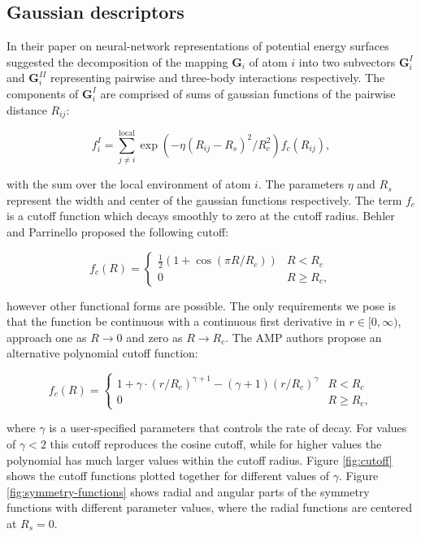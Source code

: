\subsection{Gaussian descriptors}
In their paper on neural-network representations of
potential energy surfaces \parencite[Behler, J\"{o}rg and
Parrinello, Michele]{behler2007generalized}
suggested the decomposition of the mapping $\bm{G}_i$ of atom $i$
into two subvectors $\bm{G}_i^I$ and $\bm{G}_i^{II}$ representing
pairwise and three-body interactions respectively.
The components of $\bm{G}_i^I$ are comprised of
sums of gaussian functions of the pairwise distance $R_{ij}$:

\begin{equation}
 f_i^I = \sum_{j \neq i}^{\text{local}}
    \exp \left( -\eta(R_{ij} - R_s)^2 / R_c^2 \right) f_c (R_{ij}) , 
\end{equation}

with the sum over the local environment of atom $i$.
The parameters $\eta$ and $R_s$ represent the width and center
of the gaussian functions respectively. The term $f_c$
is a cutoff function which decays smoothly to zero
at the cutoff radius. Behler and Parrinello proposed
the following cutoff:

\begin{equation}
    f_c(R) =
\begin{cases}
    \frac{1}{2}\left(1 + \cos \left(\pi R / R_c \right) \right) & R < R_c \\
    0 & R \geq R_c ,
\end{cases}
\end{equation}

however other functional forms are possible.
The only requirements we pose
is that the function be continuous with a continuous first derivative
in $r \in [0, \infty)$,
approach one as $R \rightarrow 0$
and zero as $R \rightarrow R_c$.
The AMP authors propose an alternative polynomial cutoff function:

\begin{equation}
    f_c(R) =
\begin{cases}
    1 + \gamma \cdot (r / R_c)^{\gamma + 1} - (\gamma + 1)(r / R_c)^{\gamma} & R < R_c \\
    0 & R \geq R_c ,
\end{cases}
\end{equation}

where $\gamma$ is a user-specified parameters that controls the rate of decay.
For values of $\gamma < 2$ this cutoff reproduces the cosine cutoff, while for higher
values the polynomial has much larger values within the cutoff radius.
Figure \ref{fig:cutoff} shows the cutoff functions plotted together
for different values of $\gamma$.
Figure \ref{fig:symmetry-functions} shows radial and angular parts of the symmetry functions
with different parameter values, where the radial functions are centered at $R_s = 0$.

